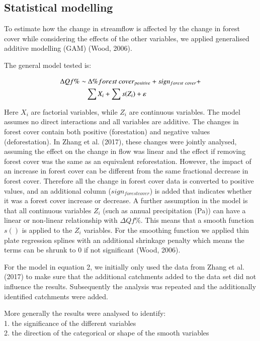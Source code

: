 \documentclass[]{elsarticle} %
\begin{document}
\hypertarget{statistical-modelling}{%
\subsection{Statistical modelling}\label{statistical-modelling}}

To estimate how the change in streamflow is affected by the change in forest cover while considering the effects of the other variables, we applied generalised additive modelling (GAM) (Wood, 2006).

The general model tested is:

\begin{align}
\Delta Qf \% \sim &~ \Delta \% forest~cover_{positive} + sign_{forest~cover} + \notag \\ 
& \sum{X_i} + \sum{s(Z_i)} + \varepsilon \label{eq:eq2}
\end{align}

Here \(X_i\) are factorial variables, while \(Z_i\) are continuous variables. The model assumes no direct interactions and all variables are additive. The changes in forest cover contain both positive (forestation) and negative values (deforestation). In Zhang et al. (2017), these changes were jointly analysed, assuming the effect on the change in flow was linear and the effect if removing forest cover was the same as an equivalent reforestation. However, the impact of an increase in forest cover can be different from the same fractional decrease in forest cover. Therefore all the change in forest cover data is converted to positive values, and an additional column (\(sign_{forest cover}\)) is added that indicates whether it was a forest cover increase or decrease.
A further assumption in the model is that all continuous variables \(Z_i\) (such as annual precipitation (Pa)) can have a linear or non-linear relationship with \(\Delta Qf \%\). This means that a smooth function \(s()\) is applied to the \(Z_i\) variables. For the smoothing function we applied thin plate regression splines with an additional shrinkage penalty which means the terms can be shrunk to 0 if not significant (Wood, 2006).

For the model in equation 2, we initially only used the data from Zhang et al. (2017) to make sure that the additional catchments added to the data set did not influence the results. Subsequently the analysis was repeated and the additionally identified catchments were added.

More generally the results were analysed to identify:\\
1. the significance of the different variables\\
2. the direction of the categorical or shape of the smooth variables
\end{document}
